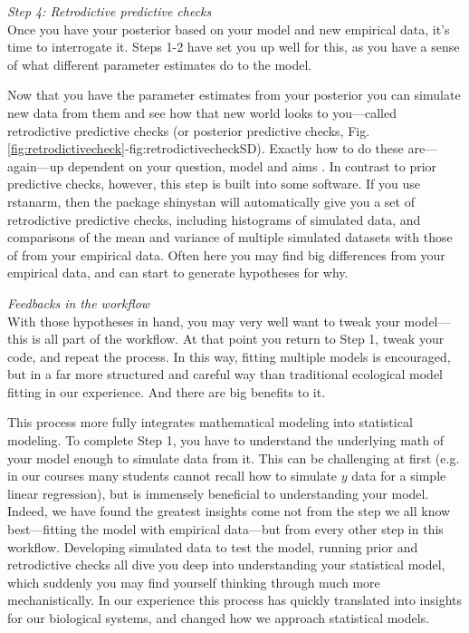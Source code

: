 \documentclass[11pt]{article}
\begin{document}
 \emph{Step 4: Retrodictive predictive checks} \\
Once you have your posterior based on your model and new empirical data, it's time to interrogate it. Steps 1-2 have set you up well for this, as you have a sense of what different parameter estimates do to the model. 

Now that you have the parameter estimates from your posterior you can simulate new data from them and see how that new world looks to you---called retrodictive predictive checks (or posterior predictive checks, Fig. \ref{fig:retrodictivecheck}-{fig:retrodictivecheckSD}). Exactly how to do these are---again---up dependent on your question, model and aims \citep[but again, there is lots written on this,][]{held2010,gelman200ppc,conn2018}. In contrast to prior predictive checks, however, this step is built into some software. If you use \textsf{rstanarm}, then the package \textsf{shinystan} will automatically give you a set of retrodictive predictive checks, including histograms of simulated data, and comparisons of the mean and variance of multiple simulated datasets with those of from your empirical data. Often here you may find big differences from your empirical data, and can start to generate hypotheses for why.

\emph{Feedbacks in the workflow}\\
With those hypotheses in hand, you may very well want to tweak your model---this is all part of the workflow. At that point you return to Step 1, tweak your code, and repeat the process. In this way, fitting multiple models is encouraged, but in a far more structured and careful way than traditional ecological model fitting in our experience. And there are big benefits to it. 

This process more fully integrates mathematical modeling into statistical modeling. To complete Step 1, you have to understand the underlying math of your model enough to simulate data from it. This can be challenging at first (e.g. in our courses many students cannot recall how to simulate $y$ data for a simple linear regression), but is immensely beneficial to understanding your model. Indeed, we have found the greatest insights come not from the step we all know best---fitting the model with empirical data---but from every other step in this workflow. Developing simulated data to test the model, running prior and retrodictive checks all dive you deep into understanding your statistical model, which suddenly you may find yourself thinking through much more mechanistically. In our experience this process has quickly translated into insights for our biological systems, and changed how we approach statistical models. 
\end{document}
